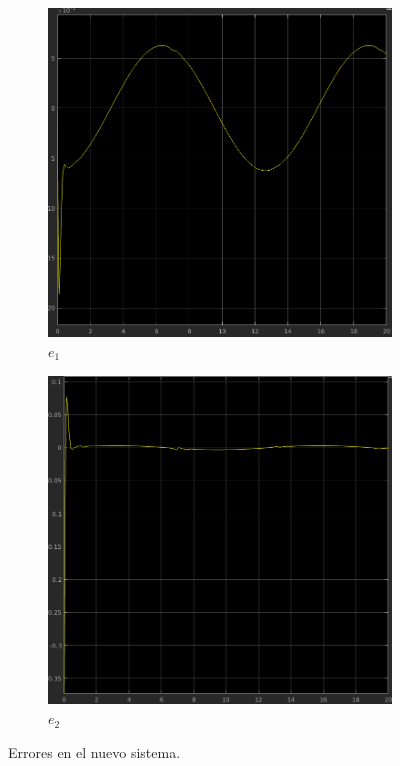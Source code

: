 \documentclass[12pt, letterpaper]{article}
\begin{document}
\begin{figure}[H]
	\centering
	\begin{subfigure}[b]{0.49\linewidth}
		\includegraphics[width=\linewidth]{e1.png}
		\caption{$e_1$}
	\end{subfigure}
	\begin{subfigure}[b]{0.49\linewidth}
		\includegraphics[width=\linewidth]{e2.png}
		\caption{$e_2$}
	\end{subfigure}
	\caption{Errores en el nuevo sistema.}
\end{figure}
\end{document}

